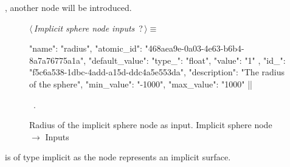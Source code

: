 \documentclass[%
    a4paper,    %
    justified,  %
    nobib,      %
    openany     %
]{tufte-book}
\begin{document}
, another node will be
introduced.

\begin{figure}
\begin{flushleft} \small
\begin{minipage}{\linewidth}\label{scrap100}\raggedright\small
{} $\langle\,${\itshape Implicit sphere node inputs}\nobreak\ {\footnotesize {?}}$\,\rangle\equiv$
\vspace{-1ex}
\begin{pythoncode}
{
    "name": "radius",
    "atomic_id": "468aea9e-0a03-4e63-b6b4-8a7a76775a1a",
    "default_value": {
        "type_": "float",
        "value": "1"
    },
    "id_": "f5c6a538-1dbc-4add-a15d-ddc4a5e553da",
    "description": "The radius of the sphere",
    "min_value": "-1000",
    "max_value": "1000"
}|\NWsep|
\end{pythoncode}
\vspace{1.5ex}
\footnotesize
\begin{list}{}{\setlength{\itemsep}{-\parsep}\setlength{\itemindent}{-\leftmargin}}
\item \NWtxtMacroRefIn\ .

\item{}
\end{list}
\end{minipage}\vspace{4ex}
\end{flushleft}
\caption{Radius of the implicit sphere node as input.
  \newline{}\newline{}Implicit sphere node $\rightarrow$ Inputs}
\label{editor:lst:nodes:sphere-node:inputs:radius}
\end{figure}

 is of type implicit as the node
represents an implicit surface.
\end{document}
